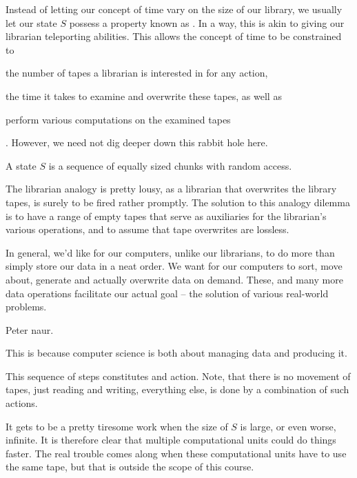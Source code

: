 Instead of letting our concept of time vary on the size of our library, we
usually let our state $S$ possess a property known as . In a
way, this is akin to giving our librarian teleporting abilities. This allows
the concept of time to be constrained to \begin{inparaenum}[(1)] \item the
number of tapes a librarian is interested in for any action, \item the time it
takes to examine and overwrite these tapes, as well as \item perform various
computations on the examined tapes\end{inparaenum}. However, we need not dig
deeper down this rabbit hole here.

\begin{definition}

A state $S$ is a sequence of equally sized chunks with random access.

\end{definition}

The librarian analogy is pretty lousy, as a librarian that overwrites the
library tapes, is surely to be fired rather promptly. The solution to this
analogy dilemma is to have a range of empty tapes that serve as auxiliaries for
the librarian's various operations, and to assume that tape overwrites are
lossless. 


In general, we'd like for our computers, unlike our librarians, to do more than
simply store our data in a neat order. We want for our computers to sort, move
about, generate and actually overwrite data on demand. These, and many more
data operations facilitate our actual goal -- the solution of various
real-world problems.

Peter naur.

This is because computer science is both about
managing data and producing it. 

This sequence of steps constitutes and action. Note, that there is no movement
of tapes, just reading and writing, everything else, is done by a combination
of such actions.


It gets to be a pretty tiresome work when the size of
$S$ is large, or even worse, infinite. It is therefore clear that multiple computational
units could do things faster. The real trouble comes along when these
computational units have to use the same tape, but that is outside the scope of
this course.

